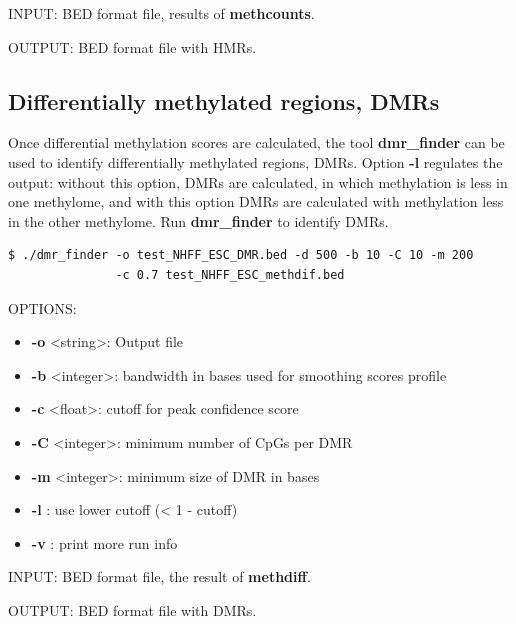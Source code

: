 \documentclass{article}
\begin{document}
INPUT: BED format file, results of \textbf{methcounts}.

OUTPUT: BED format file with HMRs.

\subsection{Differentially methylated regions, DMRs}
\label{sec:dmr}
Once differential methylation scores are calculated, the tool \textbf{dmr\_finder} can be
 used to identify differentially methylated regions, DMRs.
Option \textbf{-l} regulates the output: without this option, DMRs are calculated, in 
which methylation is less in one methylome, and with this option DMRs are calculated with methylation
less in the other methylome. Run \textbf{dmr\_finder} to identify DMRs.
\begin{verbatim}
$ ./dmr_finder -o test_NHFF_ESC_DMR.bed -d 500 -b 10 -C 10 -m 200 
               -c 0.7 test_NHFF_ESC_methdif.bed
\end{verbatim}

OPTIONS:
\begin{itemize}
\item
\textbf{-o} \textless string\textgreater : Output file
\item
\textbf{-b} \textless integer\textgreater : bandwidth in bases used for smoothing scores profile
\item
\textbf{-c} \textless float\textgreater : cutoff for peak confidence score
\item
\textbf{-C} \textless integer\textgreater : minimum number of CpGs per DMR
\item
\textbf{-m} \textless integer\textgreater : minimum size of DMR in bases
\item
\textbf{-l} : use lower cutoff (< 1 - cutoff)
\item
\textbf{-v} : print more run info
\end{itemize}

INPUT: BED format file, the result of \textbf{methdiff}.

OUTPUT: BED format file with DMRs.
\end{document}
